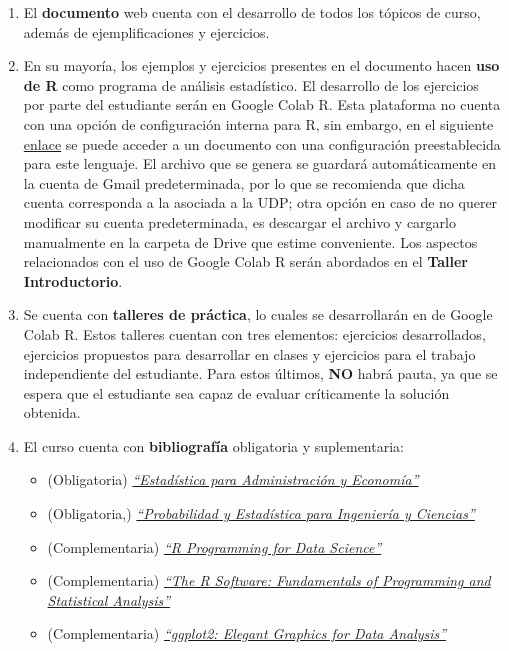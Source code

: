 \documentclass[
]{book}
\theoremstyle{definition}
\theoremstyle{definition}
\theoremstyle{definition}
\theoremstyle{definition}
\theoremstyle{remark}
\begin{document}
\begin{enumerate}
\def\labelenumi{\arabic{enumi}.}
\item
  El \textbf{documento} web cuenta con el desarrollo de todos los tópicos de curso, además de ejemplificaciones y ejercicios.
\item
  En su mayoría, los ejemplos y ejercicios presentes en el documento hacen \textbf{uso de R} como programa de análisis estadístico. El desarrollo de los ejercicios por parte del estudiante serán en Google Colab R. Esta plataforma no cuenta con una opción de configuración interna para R, sin embargo, en el siguiente \href{https://colab.to/r}{enlace} se puede acceder a un documento con una configuración preestablecida para este lenguaje. El archivo que se genera se guardará automáticamente en la cuenta de Gmail predeterminada, por lo que se recomienda que dicha cuenta corresponda a la asociada a la UDP; otra opción en caso de no querer modificar su cuenta predeterminada, es descargar el archivo y cargarlo manualmente en la carpeta de Drive que estime conveniente. Los aspectos relacionados con el uso de Google Colab R serán abordados en el \textbf{Taller Introductorio}.
\item
  Se cuenta con \textbf{talleres de práctica}, lo cuales se desarrollarán en de Google Colab R. Estos talleres cuentan con tres elementos: ejercicios desarrollados, ejercicios propuestos para desarrollar en clases y ejercicios para el trabajo independiente del estudiante. Para estos últimos, \textbf{NO} habrá pauta, ya que se espera que el estudiante sea capaz de evaluar críticamente la solución obtenida.
\item
  El curso cuenta con \textbf{bibliografía} obligatoria y suplementaria:

  \begin{itemize}
  \item
    (Obligatoria) \href{https://github.com/Dfranzani/Bases-de-datos-para-cursos/blob/main/Libros/Anderson\%2C\%20Estad\%C3\%ADstica.pdf}{\emph{``Estadística para Administración y Economía''}} \citep{anderson}
  \item
    (Obligatoria,) \href{https://github.com/Dfranzani/Bases-de-datos-para-cursos/blob/main/Libros/Devore\%2C\%20Probabilidad\%20y\%20Estad\%C3\%ADstica.pdf}{\emph{``Probabilidad y Estadística para Ingeniería y Ciencias''}} \citep{Devore}
  \item
    (Complementaria) \href{https://bookdown.org/rdpeng/rprogdatascience/}{\emph{``R Programming for Data Science''}} \citep{peng2016r}
  \item
    (Complementaria) \href{https://github.com/Dfranzani/Bases-de-datos-para-cursos/blob/main/Libros/Micheaux\%2C\%20Manual\%20de\%20R.pdf}{\emph{``The R Software: Fundamentals of Programming and Statistical Analysis''}} \citep{deMicheaux2013}
  \item
    (Complementaria) \href{https://ggplot2-book.org/}{\emph{``ggplot2: Elegant Graphics for Data Analysis''}} \citep{wickham_ggplot2_2009}
  \end{itemize}


\end{enumerate}
\end{document}

